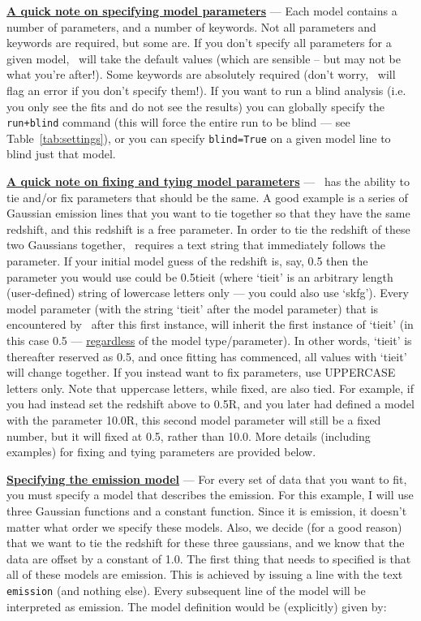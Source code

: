 \textbf{\underline{A quick note on specifying model parameters}} --- Each model
contains a number of parameters, and a number of keywords. Not all parameters
and keywords are required, but some are. If you don't specify all parameters for
a given model, \alis\ will take the default values (which are sensible -- but may not
be what you're after!). Some keywords are absolutely required (don't worry, \alis\
will flag an error if you don't specify them!). If you want to run a blind analysis
(i.e. you only see the fits and do not see the results) you can globally specify
the \texttt{run+blind} command (this will force the entire run to be
blind --- see Table~\ref{tab:settings}), or you can specify \texttt{blind=True}
on a given model line to blind just that model.

\textbf{\underline{A quick note on fixing and tying model parameters}} --- \alis\
has the ability to tie and/or fix parameters that should be the same. A good example
is a series of Gaussian emission lines that you want to tie together so that they have
the same redshift, and this redshift is a free parameter. In order to tie the redshift of
these two Gaussians together, \alis\ requires a text string that immediately follows
the parameter. If your initial model guess of the redshift is, say, 0.5 then the parameter
you would use could be 0.5tieit (where `tieit' is an arbitrary length (user-defined) string
of lowercase letters only --- you could also use `skfg'). Every model parameter
(with the string `tieit' after the model parameter) that is encountered by \alis\ after
this first instance, will inherit the first instance of `tieit'
(in this case 0.5 --- \underline{regardless} of the model type/parameter).
In other words, `tieit' is thereafter reserved as 0.5, and once fitting has commenced,
all values with `tieit' will change together. If you instead want to fix parameters, use
UPPERCASE letters only. Note that uppercase letters, while fixed, are also tied.
For example, if you had instead set the redshift  above to 0.5R, and you later had
defined a model with the parameter 10.0R, this second model parameter will still
be a fixed number, but it will fixed at 0.5, rather than 10.0. More details (including
examples) for fixing and tying parameters are provided below.

\textbf{\underline{Specifying the emission model}} --- For every set of data that
you want to fit, you must specify a model that describes the emission. For this
example, I will use three Gaussian functions and a constant function. Since it is
emission, it doesn't matter what order we specify these models. Also, we decide
(for a good reason) that we want to tie the redshift for these three gaussians, and
we know that the data are offset by a constant of 1.0. The first thing that needs to
specified is that all of these models are emission. This is achieved by issuing a
line with the text \texttt{emission} (and nothing else). Every subsequent line of
the model will be interpreted as emission. The model definition would be
(explicitly) given by:

